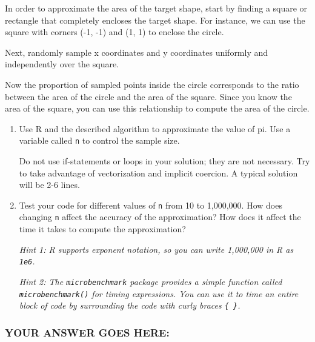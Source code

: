 \documentclass[
]{article}
\begin{document}
In order to approximate the area of the target shape, start by finding a
square or rectangle that completely encloses the target shape. For
instance, we can use the square with corners (-1, -1) and (1, 1) to
enclose the circle.

Next, randomly sample x coordinates and y coordinates uniformly and
independently over the square.

Now the proportion of sampled points inside the circle corresponds to
the ratio between the area of the circle and the area of the square.
Since you know the area of the square, you can use this relationship to
compute the area of the circle.

\begin{enumerate}
\def\labelenumi{\arabic{enumi}.}
\item
  Use R and the described algorithm to approximate the value of pi. Use
  a variable called \texttt{n} to control the sample size.

  Do not use if-statements or loops in your solution; they are not
  necessary. Try to take advantage of vectorization and implicit
  coercion. A typical solution will be 2-6 lines.
\item
  Test your code for different values of \texttt{n} from 10 to
  1,000,000. How does changing \texttt{n} affect the accuracy of the
  approximation? How does it affect the time it takes to compute the
  approximation?

  \emph{Hint 1: R supports exponent notation, so you can write 1,000,000
  in R as \texttt{1e6}.}

  \emph{Hint 2: The \texttt{microbenchmark} package provides a simple
  function called \texttt{microbenchmark()} for timing expressions. You
  can use it to time an entire block of code by surrounding the code
  with curly braces \texttt{\{\ \}}.}
\end{enumerate}

\hypertarget{your-answer-goes-here-3}{%
\subsubsection{YOUR ANSWER GOES HERE:}\label{your-answer-goes-here-3}}
\end{document}
